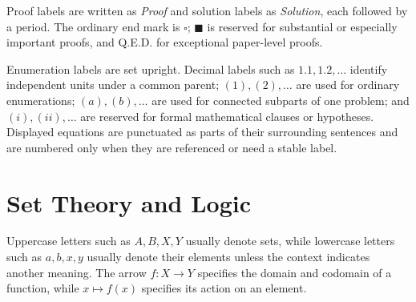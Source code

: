     Proof labels are written as \textit{Proof} and solution labels as
    \textit{Solution}, each followed by a period. The ordinary end mark is
    $\square$; $\blacksquare$ is reserved for substantial or especially
    important proofs, and \textsc{Q.E.D.} for exceptional paper-level proofs.

    Enumeration labels are set upright. Decimal labels such as $1.1,1.2,\dots$ identify
    independent units under a common parent; $(1),(2),\dots$ are used for
    ordinary enumerations; $(a),(b),\dots$ are used for connected subparts of
    one problem; and $(i),(ii),\dots$ are reserved for formal mathematical
    clauses or hypotheses. Displayed equations are punctuated as parts of their
    surrounding sentences and are numbered only when they are referenced or
    need a stable label.

    \section*{Set Theory and Logic}

    Uppercase letters such as $A,B,X,Y$ usually denote sets, while lowercase
    letters such as $a,b,x,y$ usually denote their elements unless the context
    indicates another meaning. The arrow $f\colon X\to Y$ specifies the domain and
    codomain of a function, while $x\mapsto f(x)$ specifies its action on an
    element.

    \vspace{0.5em}

